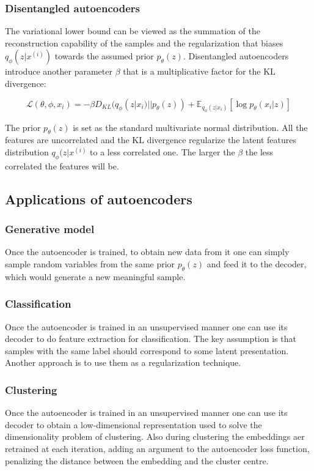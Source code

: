 		\subsubsection{Disentangled autoencoders}
		The variational lower bound can be viewed as the summation of the reconstruction capability of the samples and the regularization that biases $q_\phi(z|x^{(i)})$ towards the assumed prior $p_\theta(z)$.
		Disentangled autoencoders introduce another parameter $\beta$ that is a multiplicative factor for the KL divergence:

		$$\mathcal{L}(\theta, \phi, x_i) = -\beta D_{KL}(q_\phi(z|x_i)||p_\theta(z)) + \mathbb{E}_{q_\phi(z|x_i)}[\log p_\theta(x_i|z)]$$

		The prior $p_\theta(z)$ is set as the standard multivariate normal distribution.
		All the features are uncorrelated and the KL divergence regularize the latent features distribution $q_\phi(z|x^{(i)}$ to a less correlated one.
		The larger the $\beta$ the less correlated the features will be.

	\subsection{Applications of autoencoders}

		\subsubsection{Generative model}
		Once the autoencoder is trained, to obtain new data from it one can simply sample random variables from the same prior $p_\theta(z)$ and feed it to the decoder, which would generate a new meaningful sample.

		\subsubsection{Classification}
		Once the autoencoder is trained in an unsupervised manner one can use its decoder to do feature extraction for classification.
		The key assumption is that samples with the same label should correspond to some latent presentation.
		Another approach is to use them as a regularization technique.

		\subsubsection{Clustering}
		Once the autoencoder is trained in an unsupervised manner one can use its decoder to obtain a low-dimensional representation used to solve the dimensionality problem of clustering.
		Also during clustering the embeddings aer retrained at each iteration, adding an argument to the autoencoder loss function, penalizing the distance between the embedding and the cluster centre.

